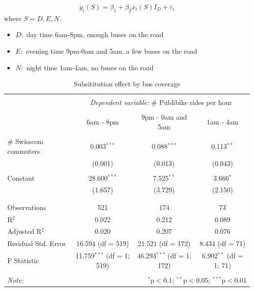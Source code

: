 \documentclass{article}
\begin{document}
\begin{align}
    y_i(S)  = \beta_1 + \beta_2 x_i (S) I_D + \varepsilon_i 
\end{align}
where $S = D, E, N$. 
\begin{itemize}
    \item $D:$ day time 6am-8pm, enough buses on the road
    \item $E:$ evening time 9pm-0am and 5am, a few buses on the road
    \item $N:$ night time 1am-4am, no buses on the road
\end{itemize}

\begin{table}[H] \centering 
  \caption{Subsititution effect by bus coverage} 
  \label{} 
\begin{tabular}{@{\extracolsep{5pt}}lccc} 
\\[-1.8ex]\hline 
\hline \\[-1.8ex] 
 & \multicolumn{3}{c}{\textit{Dependent variable:} \# Publibike rides per hour}\\ 
\cline{2-4} 
\\[-1.8ex] & 6am - 8pm & 9pm - 0am and 5am & 1am - 4am\\ 
\hline \\[-1.8ex] 
 \# Swisscom commuters & 0.003$^{***}$ & 0.088$^{***}$ & 0.113$^{**}$ \\ 
  & (0.001) & (0.013) & (0.043) \\ 
  & & & \\ 
 Constant & 28.600$^{***}$ & 7.525$^{**}$ & 3.666$^{*}$ \\ 
  & (1.657) & (3.729) & (2.150) \\ 
  & & & \\ 
\hline \\[-1.8ex] 
Observations & 521 & 174 & 73 \\ 
R$^{2}$ & 0.022 & 0.212 & 0.089 \\ 
Adjusted R$^{2}$ & 0.020 & 0.207 & 0.076 \\ 
Residual Std. Error & 16.594 (df = 519) & 21.521 (df = 172) & 8.434 (df = 71) \\ 
F Statistic & 11.759$^{***}$ (df = 1; 519) & 46.293$^{***}$ (df = 1; 172) & 6.902$^{**}$ (df = 1; 71) \\ 
\hline 
\hline \\[-1.8ex] 
\textit{Note:}  & \multicolumn{3}{r}{$^{*}$p$<$0.1; $^{**}$p$<$0.05; $^{***}$p$<$0.01} \\ 
\end{tabular} 
\end{table} 
\end{document}
